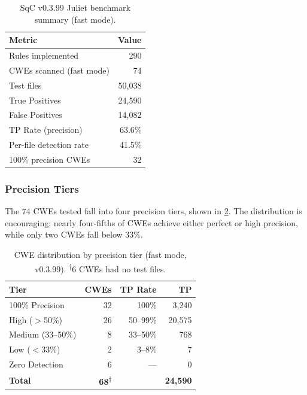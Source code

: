 \documentclass[10pt,twocolumn,letterpaper]{article}
\begin{document}
\begin{table}[t]
\centering
\footnotesize
\begin{tabular}{@{}lr@{}}
\toprule
\textbf{Metric} & \textbf{Value} \\
\midrule
Rules implemented & 290 \\
CWEs scanned (fast mode) & 74 \\
Test files & 50,038 \\
True Positives & 24,590 \\
False Positives & 14,082 \\
TP Rate (precision) & 63.6\% \\
Per-file detection rate & 41.5\% \\
100\% precision CWEs & 32 \\
\bottomrule
\end{tabular}
\caption{SqC v0.3.99 Juliet benchmark summary (fast mode).}
\label{tab:juliet-summary}
\end{table}

\subsubsection{Precision Tiers}

The 74 CWEs tested fall into four precision tiers, shown in
\cref{tab:precision-tiers}.  The distribution is encouraging: nearly
four-fifths of CWEs achieve either perfect or high precision, while
only two CWEs fall below 33\%.

\begin{table}[t]
\centering
\footnotesize
\begin{tabular}{@{}lrrr@{}}
\toprule
\textbf{Tier} & \textbf{CWEs} & \textbf{TP Rate} & \textbf{TP} \\
\midrule
100\% Precision & 32 & 100\% & 3,240 \\
High ($>$50\%) & 26 & 50--99\% & 20,575 \\
Medium (33--50\%) & 8 & 33--50\% & 768 \\
Low ($<$33\%) & 2 & 3--8\% & 7 \\
Zero Detection & 6 & --- & 0 \\
\midrule
\textbf{Total} & \textbf{68}\textsuperscript{$\dagger$} & & \textbf{24,590} \\
\bottomrule
\end{tabular}
\caption{CWE distribution by precision tier (fast mode, v0.3.99).
\textsuperscript{$\dagger$}6 CWEs had no test files.}
\label{tab:precision-tiers}
\end{table}
\end{document}
